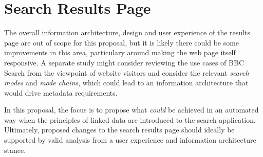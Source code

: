 \section{Search Results Page}

The overall information architecture, design and user experience of
the results page are out of scope for this proposal, but it is likely
there could be some improvements in this area, particulary around making
the web page itself responsive\cite{marcotte2010responsive}. A separate
study might consider reviewing the use cases of BBC Search from
the viewpoint of website visitors and consider the relevant
\emph{search modes} and \emph{mode chains}, which could lead to
an information architecture that would drive metadata requirements.

In this proposal, the focus is to propose what \emph{could} be
achieved in an automated way when the principles of linked data
are introduced to the search application. Ultimately, proposed
changes to the search results page should ideally be supported
by valid analysis from a user experience and information
architecture stance.
